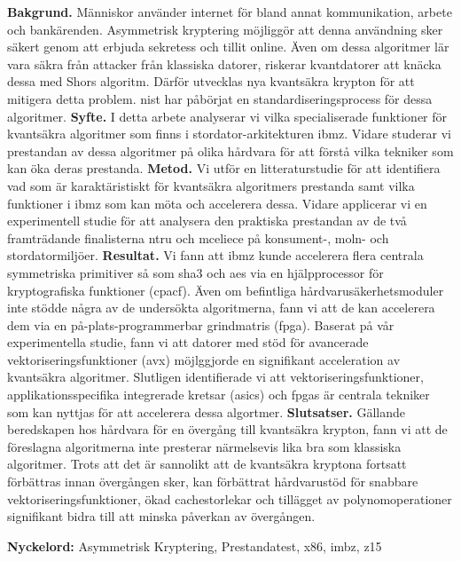 \sammanfattning
\noindent
\textbf{Bakgrund.} Människor använder internet för bland annat kommunikation, arbete och bankärenden. Asymmetrisk kryptering möjliggör att denna användning sker säkert genom att erbjuda sekretess och tillit online. Även om dessa algoritmer lär vara säkra från attacker från klassiska datorer, riskerar kvantdatorer att knäcka dessa med Shors algoritm. Därför utvecklas nya kvantsäkra krypton för att mitigera detta problem. \acrfull{nist} har påbörjat en standardiseringsprocess för dessa algoritmer.\newline
\textbf{Syfte.} I detta arbete analyserar vi vilka specialiserade funktioner för kvantsäkra algoritmer som finns i stordator-arkitekturen \gls{ibmz}. Vidare studerar vi prestandan av dessa algoritmer på olika hårdvara för att förstå vilka tekniker som kan öka deras prestanda.\newline
\textbf{Metod.} Vi utför en litteraturstudie för att identifiera vad som är karaktäristiskt för kvantsäkra algoritmers prestanda samt vilka funktioner i \gls{ibmz} som kan möta och accelerera dessa. Vidare applicerar vi en experimentell studie för att analysera den praktiska prestandan av de två framträdande finalisterna \gls{ntru} och \gls{mceliece} på konsument-, moln- och stordatormiljöer.\newline
\textbf{Resultat.} Vi fann att \gls{ibmz} kunde accelerera flera centrala symmetriska primitiver så som \gls{sha3} och \gls{aes} via en hjälpprocessor för kryptografiska funktioner (\acrshort{cpacf}). Även om befintliga hårdvarusäkerhetsmoduler inte stödde några av de undersökta algoritmerna, fann vi att de kan accelerera dem via en på-plats-programmerbar grindmatris (\acrshort{fpga}). Baserat på vår experimentella studie, fann vi att datorer med stöd för avancerade vektoriseringsfunktioner (\gls{avx}) möjlggjorde en signifikant acceleration av kvantsäkra algoritmer. Slutligen identifierade vi att vektoriseringsfunktioner, applikationsspecifika integrerade kretsar (\acrshort{asic}s) och \acrshort{fpga}s är centrala tekniker som kan nyttjas för att accelerera dessa algortmer.\newline
\textbf{Slutsatser.} Gällande beredskapen hos hårdvara för en övergång till kvantsäkra krypton, fann vi att de föreslagna algoritmerna inte presterar närmelsevis lika bra som klassiska algoritmer. Trots att det är sannolikt att de kvantsäkra kryptona fortsatt förbättras innan övergången sker, kan förbättrat hårdvarustöd för snabbare vektoriseringsfunktioner, ökad cachestorlekar och tillägget av polynomoperationer signifikant bidra till att minska påverkan av övergången.

\vspace{1cm}
\noindent
\textbf{Nyckelord:} Asymmetrisk Kryptering, Prestandatest, \gls{x86}, \gls{imbz}, \gls{z15}

\cleardoublepage